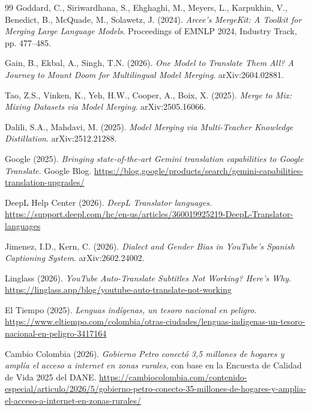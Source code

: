 \documentclass[11pt,a4paper]{article}
\begin{document}
\begin{thebibliography}{99}
 Goddard, C., Siriwardhana, S., Ehghaghi, M., Meyers, L., Karpukhin, V., Benedict, B., McQuade, M., Solawetz, J. (2024). \textit{Arcee's MergeKit: A Toolkit for Merging Large Language Models}. Proceedings of EMNLP 2024, Industry Track, pp. 477--485.

 Gain, B., Ekbal, A., Singh, T.N. (2026). \textit{One Model to Translate Them All? A Journey to Mount Doom for Multilingual Model Merging}. arXiv:2604.02881.

 Tao, Z.S., Vinken, K., Yeh, H.W., Cooper, A., Boix, X. (2025). \textit{Merge to Mix: Mixing Datasets via Model Merging}. arXiv:2505.16066.

 Dalili, S.A., Mahdavi, M. (2025). \textit{Model Merging via Multi-Teacher Knowledge Distillation}. arXiv:2512.21288.

 Google (2025). \textit{Bringing state-of-the-art Gemini translation capabilities to Google Translate}. Google Blog. \url{https://blog.google/products/search/gemini-capabilities-translation-upgrades/}

 DeepL Help Center (2026). \textit{DeepL Translator languages}. \url{https://support.deepl.com/hc/en-us/articles/360019925219-DeepL-Translator-languages}

 Jimenez, I.D., Kern, C. (2026). \textit{Dialect and Gender Bias in YouTube's Spanish Captioning System}. arXiv:2602.24002.

 Linglass (2026). \textit{YouTube Auto-Translate Subtitles Not Working? Here's Why}. \url{https://linglass.app/blog/youtube-auto-translate-not-working}

 El Tiempo (2025). \textit{Lenguas indígenas, un tesoro nacional en peligro}. \url{https://www.eltiempo.com/colombia/otras-ciudades/lenguas-indigenas-un-tesoro-nacional-en-peligro-3417164}

 Cambio Colombia (2026). \textit{Gobierno Petro conectó 3,5 millones de hogares y amplía el acceso a internet en zonas rurales}, con base en la Encuesta de Calidad de Vida 2025 del DANE. \url{https://cambiocolombia.com/contenido-especial/articulo/2026/5/gobierno-petro-conecto-35-millones-de-hogares-y-amplia-el-acceso-a-internet-en-zonas-rurales/}

\end{thebibliography}
\end{document}
